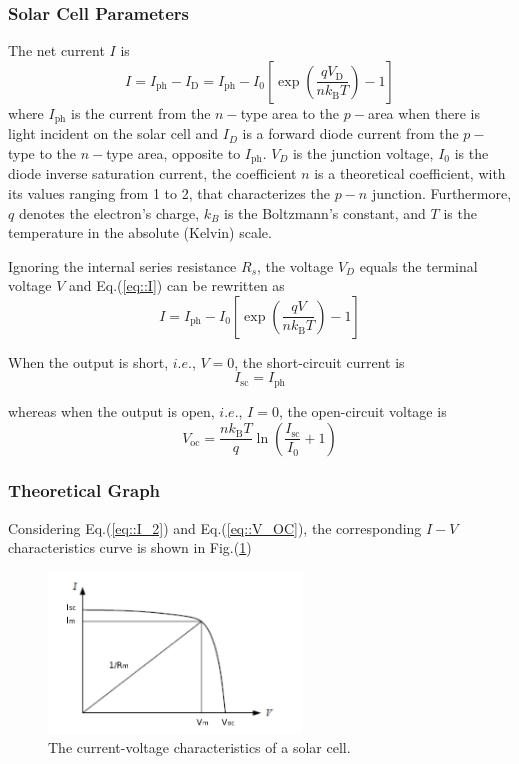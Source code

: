 \documentclass[a4paper]{article}
\begin{document}
\subsubsection{Solar Cell Parameters}
\par The net current $I$ is
\begin{equation}
	I=I_{\mathrm{ph}}-I_{\mathrm{D}}=I_{\mathrm{ph}}-I_{0}\left[\exp \left(\frac{q V_{\mathrm{D}}}{n k_{\mathrm{B}} T}\right)-1\right]
	\label{eq::I}
\end{equation}
where $I_{\text{ph}}$ is the current from the $n-$type area to the $p-$area when there is light incident on the solar cell and $I_D$ is a forward diode current from the $p-$type to the $n-$type area, opposite to $I_{\text{ph}}$.
$V_D$ is the junction voltage, $I_0$ is the diode inverse saturation current, the coefficient $n$ is a theoretical coefficient, with its values ranging from 1 to 2, that characterizes the $p-n$ junction.
Furthermore, $q$ denotes the electron’s charge, $k_B$ is the Boltzmann’s constant, and $T$ is the temperature in the absolute (Kelvin) scale.

Ignoring the internal series resistance $R_s$, the voltage $V_D$ equals the terminal voltage $V$ and Eq.(\ref{eq::I}) can be rewritten as
\begin{equation}
	I=I_{\mathrm{ph}} - I_{0} \left[ \exp \left( \frac{q V}{n k_{\mathrm{B}} T}\right) - 1 \right]
	\label{eq::I_2}
\end{equation}

When the output is short, $i.e.$, $V=0$, the short-circuit current is
$$
	I_{\mathrm{sc}}=I_{\mathrm{ph}}
$$

whereas when the output is open, $i.e.$, $I=0$, the open-circuit voltage is
\begin{equation}
	V_{\mathrm{oc}}=\frac{n k_{\mathrm{B}} T}{q} \ln \left(\frac{I_{\mathrm{sc}}}{I_{0}}+1\right)
	\label{eq::V_OC}
\end{equation}

\subsubsection{Theoretical Graph}
\par Considering Eq.(\ref{eq::I_2}) and Eq.(\ref{eq::V_OC}), the corresponding $I-V$ characteristics curve is shown in Fig.(\ref{fig::theoretical_curve})
\begin{figure}[!htbp]
	\centering
	\includegraphics[width=0.6\textwidth]{theoretical_curve.png}
	\caption{The current-voltage characteristics of a solar cell.}
	\label{fig::theoretical_curve}
\end{figure}
\end{document}
